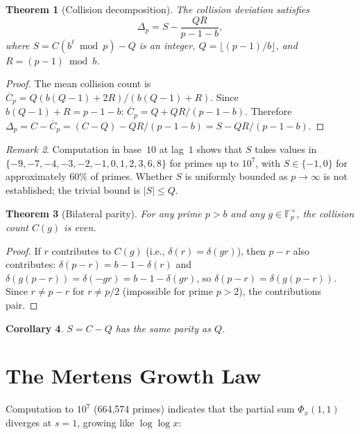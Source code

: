 \documentclass[12pt]{amsart}
\newtheorem{theorem}{Theorem}
\newtheorem{corollary}[theorem]{Corollary}
\theoremstyle{definition}
\theoremstyle{remark}
\newtheorem{remark}[theorem]{Remark}
\begin{document}
\begin{theorem}[Collision decomposition]\label{thm:decomp}
The collision deviation satisfies
\[
\Delta_p = S - \frac{QR}{p - 1 - b},
\]
where $S = C(b^{\ell} \bmod p) - Q$ is an integer,
$Q = \lfloor (p{-}1)/b \rfloor$, and $R = (p{-}1) \bmod b$.
\end{theorem}

\begin{proof}
The mean collision count is
$\overline{C}_p = Q(b(Q{-}1) + 2R) / (b(Q{-}1) + R)$.
Since $b(Q{-}1) + R = p - 1 - b$:
$\overline{C}_p = Q + QR/(p{-}1{-}b)$.
Therefore $\Delta_p = C - \overline{C}_p
= (C - Q) - QR/(p{-}1{-}b) = S - QR/(p{-}1{-}b)$.
\end{proof}

\begin{remark}
Computation in base~$10$ at lag~$1$ shows that $S$ takes
values in $\{-9, -7, -4, -3, -2, -1, 0, 1, 2, 3, 6, 8\}$
for primes up to $10^7$, with $S \in \{-1, 0\}$ for
approximately $60\%$ of primes. Whether $S$ is uniformly
bounded as $p \to \infty$ is not established; the trivial
bound is $|S| \le Q$.
\end{remark}

\begin{theorem}[Bilateral parity]\label{thm:parity}
For any prime $p > b$ and any $g \in \mathbb{F}_p^{\times}$,
the collision count $C(g)$ is even.
\end{theorem}

\begin{proof}
If $r$ contributes to $C(g)$ (i.e., $\delta(r) = \delta(gr)$),
then $p - r$ also contributes: $\delta(p{-}r) = b{-}1{-}\delta(r)$
and $\delta(g(p{-}r)) = \delta(-gr) = b{-}1{-}\delta(gr)$,
so $\delta(p{-}r) = \delta(g(p{-}r))$. Since $r \ne p - r$
for $r \ne p/2$ (impossible for prime $p > 2$), the
contributions pair.
\end{proof}

\begin{corollary}
$S = C - Q$ has the same parity as $Q$.
\end{corollary}

\section{The Mertens Growth Law}

Computation to $10^7$ (664,574 primes) indicates that
the partial sum $\Phi_x(1, 1)$ diverges at $s = 1$, growing
like $\log\log x$:
\end{document}
